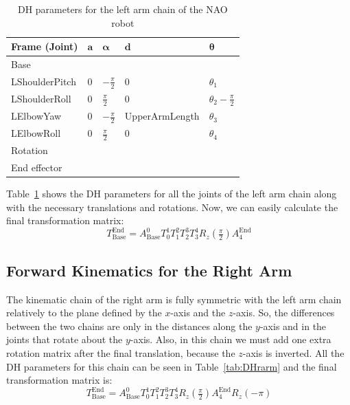 \begin{table}[t!]
\centering
\caption{DH parameters for the left arm chain of the NAO robot}
\label{tab:DHlarm}
\begin{tabular}{|l|>{\centering\arraybackslash}m{2.55cm}|>{\centering\arraybackslash}m{2.55cm}|>{\centering\arraybackslash}m{2.55cm}|>{\centering\arraybackslash}m{2.55cm}|}
\hline
\textbf{Frame (Joint)} & $\mathbf{a}$ & $\boldsymbol{\alpha}$ & $\mathbf{d}$ & $\boldsymbol{\theta}$\\ \hline
Base & \multicolumn{4}{c|}{$A(0,\text{\footnotesize{ShoulderOffsetY+ElbowOffsetY}},\text{\footnotesize{ShoulderOffsetZ}})$} \\ \hline
LShoulderPitch & $0$ & $-\frac{\pi}{2}$ & $0$ & $\theta_1$ \\ \hline
LShoulderRoll & $0$ & $\frac{\pi}{2}$ & $0$ & $\theta_2 - \frac{\pi}{2}$ \\ \hline
LElbowYaw & $0$ & $-\frac{\pi}{2}$ & \footnotesize{UpperArmLength} & $\theta_3$ \\ \hline
LElbowRoll & $0$ & $\frac{\pi}{2}$ & $0$ & $\theta_4$ \\ \hline
Rotation & \multicolumn{4}{c|}{$R_z(\frac{\pi}{2})$} \\ \hline
End effector & \multicolumn{4}{c|}{$A(\text{\footnotesize{HandOffsetX+LowerArmLength}},0,0)$} \\ \hline
\end{tabular}
\end{table}

Table~\ref{tab:DHlarm} shows the DH parameters for all the joints of the left arm chain along with the necessary translations and rotations.
Now, we can easily calculate the final transformation matrix:
\[
T^\text{End}_\text{Base} = A^0_\text{Base}T^1_0T^2_1T^3_2T^4_3R_z(\tfrac{\pi}{2})A^\text{End}_{4}
\]

\subsection{Forward Kinematics for the Right Arm}
The kinematic chain of the right arm is fully symmetric with the left arm chain relatively to the plane defined by the $x$-axis and the $z$-axis. So, the differences between the two chains are only in the distances along the $y$-axis and in the joints that rotate about the $y$-axis. Also, in this chain we must add one extra rotation matrix after the final translation, because the $z$-axis is inverted. All the DH parameters for this chain can be seen in Table~\ref{tab:DHrarm} and the final transformation matrix is:
\[
T^\text{End}_\text{Base} = A^0_\text{Base}T^1_0T^2_1T^3_2T^4_3R_z(\tfrac{\pi}{2})A^\text{End}_{4}R_z(-\pi)
\]

